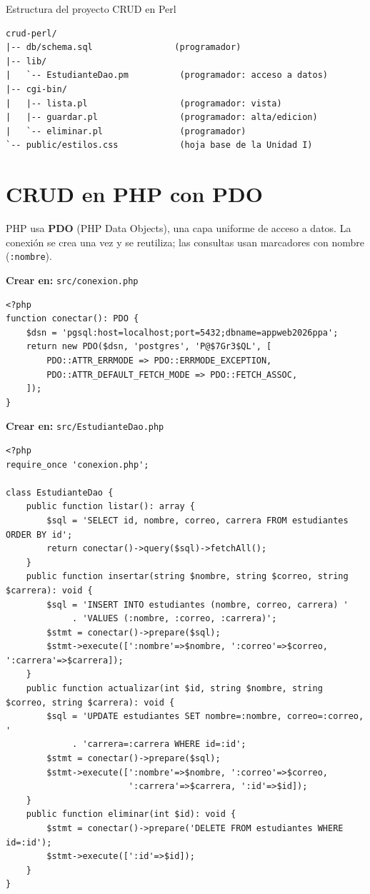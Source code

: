 \begin{cajaejemplo}{Estructura del proyecto CRUD en Perl}
\begin{lstlisting}[style=shell,caption={Estructura del CRUD Perl},label={lst:c6-perl-tree}]
crud-perl/
|-- db/schema.sql                (programador)
|-- lib/
|   `-- EstudianteDao.pm          (programador: acceso a datos)
|-- cgi-bin/
|   |-- lista.pl                  (programador: vista)
|   |-- guardar.pl                (programador: alta/edicion)
|   `-- eliminar.pl               (programador)
`-- public/estilos.css            (hoja base de la Unidad I)
\end{lstlisting}
\end{cajaejemplo}

\section{CRUD en PHP con PDO}
\label{sec:cap6:php}

PHP usa \textbf{PDO} (PHP Data Objects), una capa uniforme de acceso a
datos. La conexión se crea una vez y se reutiliza; las consultas usan
marcadores con nombre (\texttt{:nombre}).

{\small\textbf{Crear en:} \texttt{src/conexion.php}}
\begin{lstlisting}[style=php,caption={conexion.php --- conexion PDO},label={lst:c6-php-cn}]
<?php
function conectar(): PDO {
    $dsn = 'pgsql:host=localhost;port=5432;dbname=appweb2026ppa';
    return new PDO($dsn, 'postgres', 'P@$7Gr3$QL', [
        PDO::ATTR_ERRMODE => PDO::ERRMODE_EXCEPTION,
        PDO::ATTR_DEFAULT_FETCH_MODE => PDO::FETCH_ASSOC,
    ]);
}
\end{lstlisting}

{\small\textbf{Crear en:} \texttt{src/EstudianteDao.php}}
\begin{lstlisting}[style=php,caption={EstudianteDao.php --- CRUD con PDO},label={lst:c6-php-dao}]
<?php
require_once 'conexion.php';

class EstudianteDao {
    public function listar(): array {
        $sql = 'SELECT id, nombre, correo, carrera FROM estudiantes ORDER BY id';
        return conectar()->query($sql)->fetchAll();
    }
    public function insertar(string $nombre, string $correo, string $carrera): void {
        $sql = 'INSERT INTO estudiantes (nombre, correo, carrera) '
             . 'VALUES (:nombre, :correo, :carrera)';
        $stmt = conectar()->prepare($sql);
        $stmt->execute([':nombre'=>$nombre, ':correo'=>$correo, ':carrera'=>$carrera]);
    }
    public function actualizar(int $id, string $nombre, string $correo, string $carrera): void {
        $sql = 'UPDATE estudiantes SET nombre=:nombre, correo=:correo, '
             . 'carrera=:carrera WHERE id=:id';
        $stmt = conectar()->prepare($sql);
        $stmt->execute([':nombre'=>$nombre, ':correo'=>$correo,
                        ':carrera'=>$carrera, ':id'=>$id]);
    }
    public function eliminar(int $id): void {
        $stmt = conectar()->prepare('DELETE FROM estudiantes WHERE id=:id');
        $stmt->execute([':id'=>$id]);
    }
}
\end{lstlisting}

